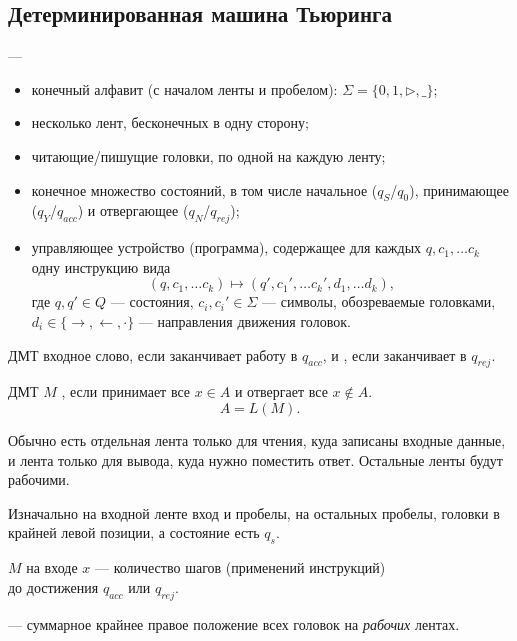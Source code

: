 \subsection{Детерминированная машина Тьюринга}
\begin{defn}
	 ---
	\begin{itemize}[noitemsep]
		\item конечный алфавит (с началом ленты и пробелом): $ \Sigma  = \{0, 1, \triangleright, \_\}$;
		\item несколько лент, бесконечных в одну сторону;
		\item читающие/пишущие головки, по одной на каждую ленту;
		\item конечное множество состояний, в том числе начальное ($ q_S$/$q_0$), принимающее ($ q_Y $/$ q_{acc}$) и отвергающее ($ q_N$/$ q_{rej}$);
		\item управляющее устройство (программа), содержащее для каждых $ q, c_1, \ldots c_k$ одну инструкцию вида
			\[
				(q, c_1, \ldots c_k) \mapsto (q', c_1', \ldots c_k', d_1, \ldots d_k)
			,\]
			где $ q, q' \in Q$ --- состояния, $ c_i, c_i' \in \Sigma $ --- символы, обозреваемые головками, $ d_i \in \{ \to , \leftarrow, \cdot  \}$ --- направления движения головок.
	\end{itemize}

	ДМТ  входное слово, если заканчивает работу в $ q_{acc}$, и , если заканчивает в $ q_{rej}$.

	ДМТ $ M$ , если принимает все $ x \in A$ и отвергает все $ x \not\in A$.
	\[
		A = L(M)
	.\]
\end{defn}
\begin{note}
	Обычно есть отдельная лента только для чтения, куда записаны входные данные, \\
	и лента только для вывода, куда нужно поместить ответ. Остальные ленты будут рабочими.
\end{note}
\begin{note}
	Изначально на входной ленте вход и пробелы, на остальных пробелы, головки в крайней левой позиции, а состояние есть $ q_s$.
\end{note}

\begin{defn}
	  $ M$ на входе $ x$ --- количество шагов (применений инструкций) \\ 
	до  достижения $ q_{acc}$ или $ q_{rej}$.

	\noindent
	  --- суммарное крайнее правое положение всех головок на \textit{рабочих} лентах.
\end{defn}

